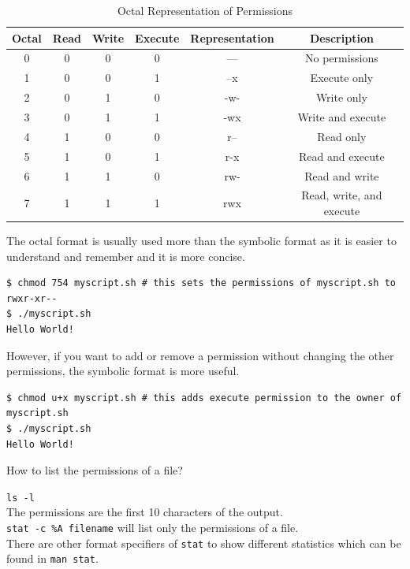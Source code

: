 \begin{table}
\caption{Octal Representation of Permissions}
\begin{tabular}{ c c c c c c }
  \toprule
  Octal & Read & Write & Execute & Representation & Description \\
 \midrule
  0 & 0 & 0 & 0 & --- & No permissions \\
  1 & 0 & 0 & 1 & --x & Execute only \\
  2 & 0 & 1 & 0 & -w- & Write only \\
  3 & 0 & 1 & 1 & -wx & Write and execute \\
  4 & 1 & 0 & 0 & r-- & Read only \\
  5 & 1 & 0 & 1 & r-x & Read and execute \\
  6 & 1 & 1 & 0 & rw- & Read and write \\
  7 & 1 & 1 & 1 & rwx & Read, write, and execute \\
 \bottomrule
\end{tabular}
\end{table}

The octal format is usually used more than the symbolic format as it is easier to understand and remember and it is more concise.

\begin{lstlisting}
$ chmod 754 myscript.sh # this sets the permissions of myscript.sh to rwxr-xr--
$ ./myscript.sh
Hello World!
\end{lstlisting}

However, if you want to add or remove a permission without changing the other permissions, the symbolic format is more useful.

\begin{lstlisting}
$ chmod u+x myscript.sh # this adds execute permission to the owner of myscript.sh
$ ./myscript.sh
Hello World!
\end{lstlisting}

\begin{qs}
  How to list the permissions of a file?
\end{qs}

\begin{ans}
  \lstinline|ls -l| \\
  The permissions are the first 10 characters of the output.\\
  \lstinline|stat -c %A filename| will list only the permissions of a file.\\
  There are other format specifiers of \lstinline|stat| to show different statistics
  which can be found in \lstinline|man stat|.
\end{ans}

